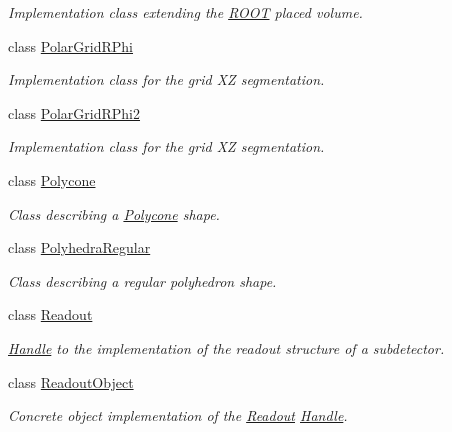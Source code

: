 \begin{DoxyCompactItemize}
\begin{DoxyCompactList}\small\item\em Implementation class extending the \hyperlink{namespace_r_o_o_t}{R\+O\+OT} placed volume. \end{DoxyCompactList}\item 
class \hyperlink{class_d_d4hep_1_1_geometry_1_1_polar_grid_r_phi}{Polar\+Grid\+R\+Phi}
\begin{DoxyCompactList}\small\item\em Implementation class for the grid XZ segmentation. \end{DoxyCompactList}\item 
class \hyperlink{class_d_d4hep_1_1_geometry_1_1_polar_grid_r_phi2}{Polar\+Grid\+R\+Phi2}
\begin{DoxyCompactList}\small\item\em Implementation class for the grid XZ segmentation. \end{DoxyCompactList}\item 
class \hyperlink{class_d_d4hep_1_1_geometry_1_1_polycone}{Polycone}
\begin{DoxyCompactList}\small\item\em Class describing a \hyperlink{class_d_d4hep_1_1_geometry_1_1_polycone}{Polycone} shape. \end{DoxyCompactList}\item 
class \hyperlink{class_d_d4hep_1_1_geometry_1_1_polyhedra_regular}{Polyhedra\+Regular}
\begin{DoxyCompactList}\small\item\em Class describing a regular polyhedron shape. \end{DoxyCompactList}\item 
class \hyperlink{class_d_d4hep_1_1_geometry_1_1_readout}{Readout}
\begin{DoxyCompactList}\small\item\em \hyperlink{class_d_d4hep_1_1_handle}{Handle} to the implementation of the readout structure of a subdetector. \end{DoxyCompactList}\item 
class \hyperlink{class_d_d4hep_1_1_geometry_1_1_readout_object}{Readout\+Object}
\begin{DoxyCompactList}\small\item\em Concrete object implementation of the \hyperlink{class_d_d4hep_1_1_geometry_1_1_readout}{Readout} \hyperlink{class_d_d4hep_1_1_handle}{Handle}. \end{DoxyCompactList}\item 

\end{DoxyCompactItemize}

